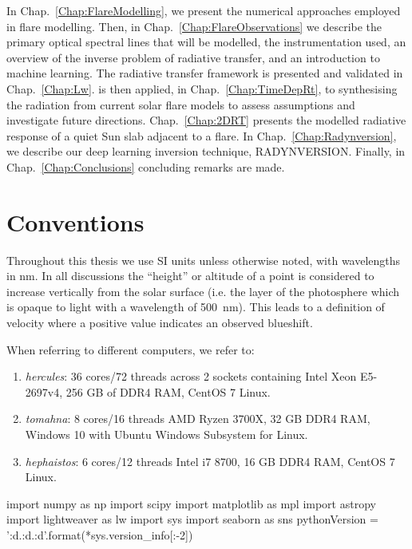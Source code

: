 In Chap.~\ref{Chap:FlareModelling}, we present the numerical approaches employed in flare modelling.
Then, in Chap.~\ref{Chap:FlareObservations} we describe the primary optical spectral lines that will be modelled, the instrumentation used, an overview of the inverse problem of radiative transfer, and an introduction to machine learning.
The \Lw{} radiative transfer framework is presented and validated in Chap.~\ref{Chap:Lw}.
\Lw{} is then applied, in Chap.~\ref{Chap:TimeDepRt}, to synthesising the radiation from current solar flare models to assess assumptions and investigate future directions.
Chap.~\ref{Chap:2DRT} presents the modelled radiative response of a quiet Sun slab adjacent to a flare.
In Chap.~\ref{Chap:Radynversion}, we describe our deep learning inversion technique, RADYNVERSION.
Finally, in Chap.~\ref{Chap:Conclusions} concluding remarks are made.


\section{Conventions}\label{Sec:Conventions}

Throughout this thesis we use SI units unless otherwise noted, with wavelengths in \si{\nano\m}.
In all discussions the ``height'' or altitude of a point is considered to increase vertically from the solar surface (i.e. the layer of the photosphere which is opaque to light with a wavelength of \SI{500}{\nano\m}).
This leads to a definition of velocity where a positive value indicates an observed blueshift.

When referring to different computers, we refer to:
\begin{enumerate}
    \item \emph{hercules}: 36 cores/72 threads across 2 sockets containing Intel Xeon E5-2697v4, 256 GB of DDR4 RAM, CentOS 7 Linux.
    \item \emph{tomahna}: 8 cores/16 threads AMD Ryzen 3700X, 32 GB DDR4 RAM, Windows 10 with Ubuntu Windows Subsystem for Linux.
    \item \emph{hephaistos}: 6 cores/12 threads Intel i7 8700, 16 GB DDR4 RAM, CentOS 7 Linux.
\end{enumerate}

\begin{pycode}[Intro]
import numpy as np
import scipy
import matplotlib as mpl
import astropy
import lightweaver as lw
import sys
import seaborn as sns
pythonVersion = '{:d}.{:d}.{:d}'.format(*sys.version_info[:-2])
\end{pycode}

